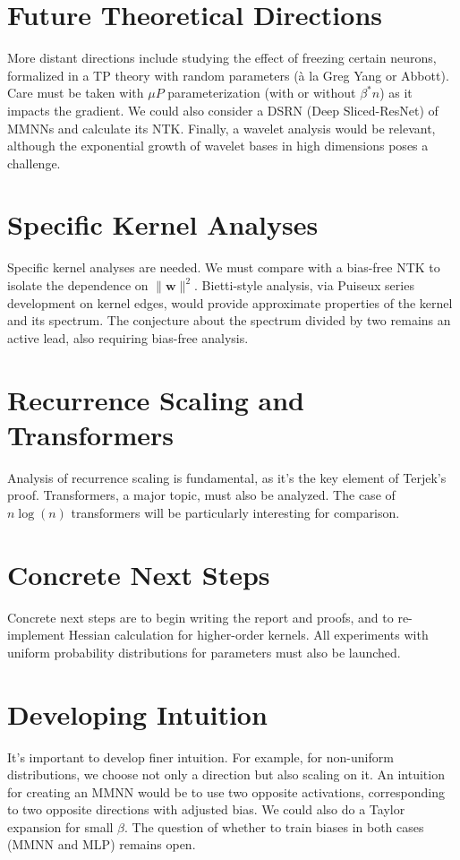 \documentclass{article}
\begin{document}
\section{Future Theoretical Directions}
More distant directions include studying the effect of freezing certain neurons, formalized in a TP theory with random parameters (à la Greg Yang or Abbott). Care must be taken with $\mu P$ parameterization (with or without $\beta^*n$) as it impacts the gradient. We could also consider a DSRN (Deep Sliced-ResNet) of MMNNs and calculate its NTK. Finally, a wavelet analysis would be relevant, although the exponential growth of wavelet bases in high dimensions poses a challenge.

\section{Specific Kernel Analyses}
Specific kernel analyses are needed. We must compare with a bias-free NTK to isolate the dependence on $\|\bm{w}\|^2$. Bietti-style analysis, via Puiseux series development on kernel edges, would provide approximate properties of the kernel and its spectrum. The conjecture about the spectrum divided by two remains an active lead, also requiring bias-free analysis.

\section{Recurrence Scaling and Transformers}
Analysis of recurrence scaling is fundamental, as it's the key element of Terjek's proof. Transformers, a major topic, must also be analyzed. The case of $n\log(n)$ transformers will be particularly interesting for comparison.

\section{Concrete Next Steps}
Concrete next steps are to begin writing the report and proofs, and to re-implement Hessian calculation for higher-order kernels. All experiments with uniform probability distributions for parameters must also be launched.

\section{Developing Intuition}
It's important to develop finer intuition. For example, for non-uniform distributions, we choose not only a direction but also scaling on it. An intuition for creating an MMNN would be to use two opposite activations, corresponding to two opposite directions with adjusted bias. We could also do a Taylor expansion for small $\beta$. The question of whether to train biases in both cases (MMNN and MLP) remains open.
\end{document}
